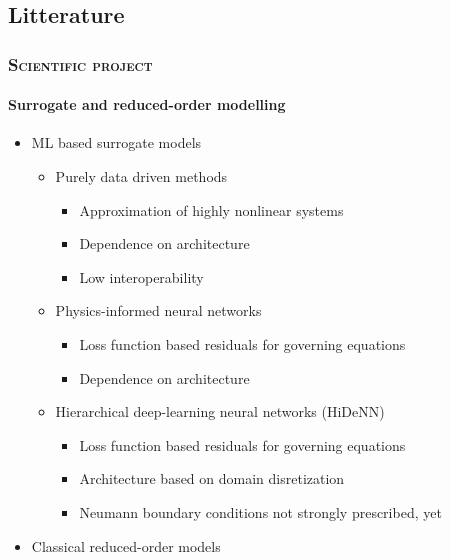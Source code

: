 \documentclass[aspectratio=1610, 10pt]{beamer}
\begin{document}
\subsection{Litterature }
\begin{frame}
    \frametitle{\textsc{Scientific project}}
    \framesubtitle{Surrogate and reduced-order modelling } 
    \begin{itemize}
        \item ML based surrogate models
        \begin{itemize}
            \item Purely data driven methods
            \begin{itemize}
                \item[{\footnotesize \color{LGreenLMS} \faPlusSquare}] Approximation of highly nonlinear systems
                \item[{\footnotesize \color{RougeLMS} \faMinusSquare}] Dependence on architecture 
                \item[{\footnotesize \color{RougeLMS} \faMinusSquare}] Low interoperability
            \end{itemize}
            \item Physics-informed neural networks
            \begin{itemize}
                \item[{\footnotesize \color{LGreenLMS} \faPlusSquare}] Loss function based residuals for governing equations
                \item[{\footnotesize \color{RougeLMS} \faMinusSquare}] Dependence on architecture 
            \end{itemize}
            \item Hierarchical deep-learning neural networks (HiDeNN)
            \begin{itemize}
                \item[{\footnotesize \color{LGreenLMS} \faPlusSquare}] Loss function based residuals for governing equations
                \item[{\footnotesize \color{LGreenLMS} \faPlusSquare}] Architecture based on domain disretization
                \item[{\footnotesize \color{RougeLMS} \faMinusSquare}] Neumann boundary conditions not strongly prescribed, yet
            \end{itemize}
        \end{itemize}
        \item Classical reduced-order models
        \begin{itemize}

\end{itemize}
\end{itemize}
\end{frame}
\end{document}
